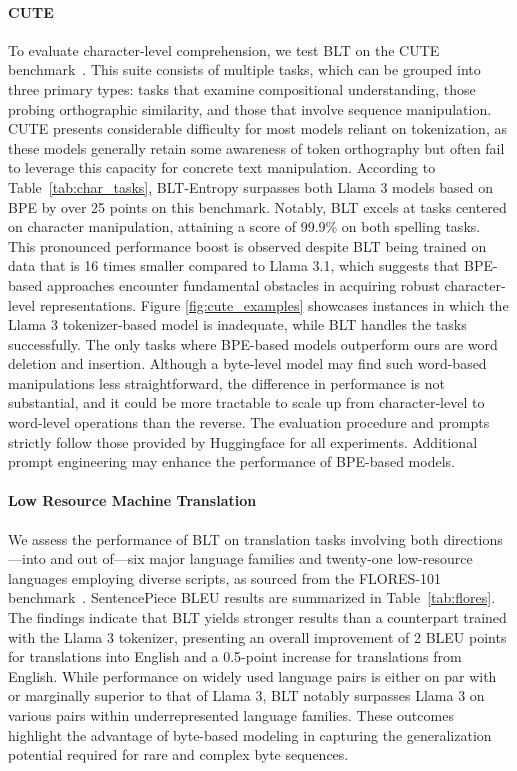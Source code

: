 \paragraph{CUTE}
To evaluate character-level comprehension, we test {\textsc BLT} on the CUTE benchmark~\citep{edman2024cute}. This suite consists of multiple tasks, which can be grouped into three primary types: tasks that examine compositional understanding, those probing orthographic similarity, and those that involve sequence manipulation. CUTE presents considerable difficulty for most models reliant on tokenization, as these models generally retain some awareness of token orthography but often fail to leverage this capacity for concrete text manipulation. According to Table~\ref{tab:char_tasks}, {\textsc BLT}-Entropy surpasses both Llama 3 models based on BPE by over 25 points on this benchmark. Notably, {\textsc BLT} excels at tasks centered on character manipulation, attaining a score of 99.9\% on both spelling tasks. This pronounced performance boost is observed despite {\textsc BLT} being trained on data that is 16 times smaller compared to Llama 3.1, which suggests that BPE-based approaches encounter fundamental obstacles in acquiring robust character-level representations. Figure \ref{fig:cute_examples} showcases instances in which the Llama 3 tokenizer-based model is inadequate, while {\textsc BLT} handles the tasks successfully. The only tasks where BPE-based models outperform ours are word deletion and insertion. Although a byte-level model may find such word-based manipulations less straightforward, the difference in performance is not substantial, and it could be more tractable to scale up from character-level to word-level operations than the reverse. The evaluation procedure and prompts strictly follow those provided by Huggingface for all experiments. Additional prompt engineering may enhance the performance of BPE-based models.

\paragraph{Low Resource Machine Translation} We assess the performance of {\textsc BLT} on translation tasks involving both directions—into and out of—six major language families and twenty-one low-resource languages employing diverse scripts, as sourced from the FLORES-101 benchmark~\citep{goyal2022flores}. SentencePiece BLEU results are summarized in Table~\ref{tab:flores}. The findings indicate that {\textsc BLT} yields stronger results than a counterpart trained with the Llama 3 tokenizer, presenting an overall improvement of 2 BLEU points for translations into English and a 0.5-point increase for translations from English. While performance on widely used language pairs is either on par with or marginally superior to that of Llama 3, {\textsc BLT} notably surpasses Llama 3 on various pairs within underrepresented language families. These outcomes highlight the advantage of byte-based modeling in capturing the generalization potential required for rare and complex byte sequences.

